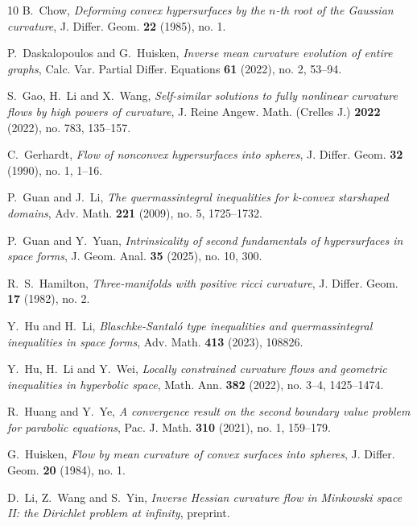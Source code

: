 \documentclass[reqno]{amsart}
\theoremstyle{remark}
\theoremstyle{definition}
\numberwithin{equation}{section}
\begin{document}
\begin{thebibliography}{10}
 B.~Chow, {\em Deforming convex hypersurfaces by the $n$-th root of the Gaussian curvature}, J. Differ. Geom. {\bf 22} (1985), no. 1.

 P.~Daskalopoulos and G.~Huisken, {\em Inverse mean curvature evolution of entire graphs}, Calc. Var. Partial Differ. Equations {\bf 61} (2022), no. 2, 53--94.

 S.~Gao, H.~Li and X.~Wang, {\em Self-similar solutions to fully nonlinear curvature flows by high powers of curvature}, J. Reine Angew. Math. (Crelles J.) {\bf 2022} (2022), no. 783, 135--157.

 C.~Gerhardt, {\em Flow of nonconvex hypersurfaces into spheres}, J. Differ. Geom. {\bf 32} (1990), no. 1, 1--16.


 P.~Guan and J.~Li, {\em The quermassintegral inequalities for k-convex starshaped domains}, Adv. Math. {\bf 221} (2009), no. 5, 1725--1732.

 P.~Guan and Y.~Yuan, {\em Intrinsicality of second fundamentals of hypersurfaces in space forms}, J. Geom. Anal. {\bf 35} (2025), no. 10, 300.

 R.~S.~Hamilton, {\em Three-manifolds with positive ricci curvature}, J. Differ. Geom. {\bf 17} (1982), no. 2.

 Y.~Hu and H.~Li, {\em Blaschke-Santaló type inequalities and quermassintegral inequalities in space forms}, Adv. Math. {\bf 413} (2023), 108826.

 Y.~Hu, H.~Li and Y.~Wei, {\em Locally constrained curvature flows and geometric inequalities in hyperbolic space}, Math. Ann. {\bf 382} (2022), no. 3--4, 1425--1474.

 R.~Huang and Y.~Ye, {\em A convergence result on the second boundary value problem for parabolic equations}, Pac. J. Math. {\bf 310} (2021), no. 1, 159--179.

 G.~Huisken, {\em Flow by mean curvature of convex surfaces into spheres}, J. Differ. Geom. {\bf 20} (1984), no. 1.

 D.~Li, Z.~Wang and S.~Yin, {\em Inverse Hessian curvature flow in Minkowski space II: the Dirichlet problem at infinity}, preprint.


\end{thebibliography}
\end{document}

